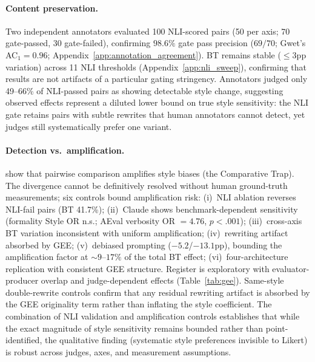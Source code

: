 \paragraph{Content preservation.}
Two independent annotators evaluated 100 NLI-scored pairs (50 per axis; 70 gate-passed, 30 gate-failed), confirming $98.6\%$ gate pass precision ($69/70$; Gwet's AC$_1 = 0.96$; Appendix~\ref{app:annotation_agreement}).
\label{sec:nli_threshold}
BT remains stable (${\leq}3$pp variation) across 11 NLI thresholds (Appendix~\ref{app:nli_sweep}), confirming that results are not artifacts of a particular gating stringency.
Annotators judged only 49--66\% of NLI-passed pairs as showing detectable style change, suggesting observed effects represent a diluted lower bound on true style sensitivity: the NLI gate retains pairs with subtle rewrites that human annotators cannot detect, yet judges still systematically prefer one variant.

\paragraph{Detection vs.\ amplification.}
\label{sec:amplification}
\citet{jeong2025comparative} show that pairwise comparison amplifies style biases (the Comparative Trap).
The divergence cannot be definitively resolved without human ground-truth measurements; six controls bound amplification risk: (i)~NLI ablation reverses NLI-fail pairs (BT 41.7\%); (ii)~Claude shows benchmark-dependent sensitivity (formality Style OR n.s.; AEval verbosity OR $= 4.76$, $p < .001$); (iii)~cross-axis BT variation inconsistent with uniform amplification; (iv)~rewriting artifact absorbed by GEE; (v)~debiased prompting ($-5.2$/$-13.1$pp), bounding the amplification factor at ${\sim}9$--$17\%$ of the total BT effect; (vi)~four-architecture replication with consistent GEE structure.
Register is exploratory with evaluator-producer overlap and judge-dependent effects (Table~\ref{tab:gee}).
Same-style double-rewrite controls confirm that any residual rewriting artifact is absorbed by the GEE originality term rather than inflating the style coefficient.
The combination of NLI validation and amplification controls establishes that while the exact magnitude of style sensitivity remains bounded rather than point-identified, the qualitative finding (systematic style preferences invisible to Likert) is robust across judges, axes, and measurement assumptions.
